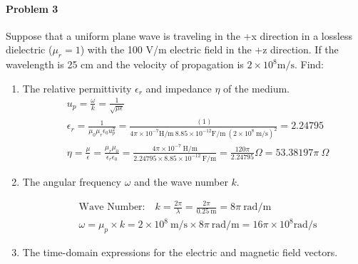 \documentclass[12pt]{scrartcl}
\begin{document}
{\paragraph*{Problem 3}
Suppose that a uniform plane wave is traveling in the +x direction in a lossless dielectric ($\mu_r=1$) with the 100 V/m electric field in the +z direction. If the wavelength is 25 cm and the velocity of propagation is $2\times 10^8 \si{\meter / \second}$. Find:
\begin{enumerate}[label=(\alph*)]
\item The relative permittivity $\epsilon_r$ and impedance $\eta$ of the medium.
\begin{align*}
& u_p = \frac{\omega}{k} = \frac{1}{\sqrt{\mu \epsilon}} \\
& \epsilon_r = \frac{1}{\mu_0 \mu_r \epsilon_0 u_p^2} = \frac{ \ (1)}{4 \pi \times 10 ^{-7}  \si{\henry / \meter } \  8.85 \times 10^{-12} \si{\farad / \meter} \ (2\times 10^8 \ \si{\meter / \second})^2} = 2.24795 \\
& \eta = \frac{\mu}{\epsilon} = \frac{\mu_r \mu_0}{\epsilon_r \epsilon_0} = \frac{4 \pi \times 10 ^{-7}  \ \si{\henry / \meter }}{2.24795 \times 8.85 \times 10^{-12} \  \si{\farad / \meter}} = \frac{120 \pi}{2.24795} \Omega = 53.38197 \pi \ \Omega
\end{align*}

\item The angular frequency $\omega$ and the wave number $k$.

\begin{align*}
& \text{Wave Number:} \quad k = \frac{2\pi}{\lambda} = \frac{2 \pi}{0.25 \ \si{\meter}} = 8 \pi \ \si{\radian / \meter} \\
& \omega = \mu_p \times k = 2 \times 10^8 \ \si{\meter / \second} \times 8 \pi \ \si{\radian / \meter} = 16 \pi \times 10^8 \si{\radian / \second}
\end{align*}
\item The time-domain expressions for the electric and magnetic field vectors.


\end{enumerate}}
\end{document}
